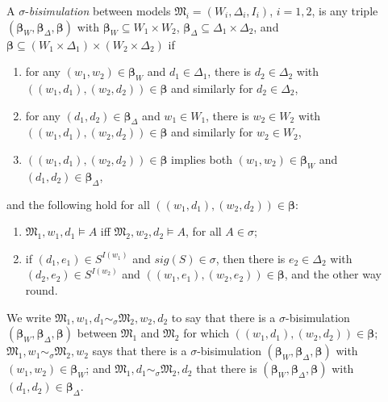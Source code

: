 \documentclass[10pt,a4paper]{amsart}
\theoremstyle{plain}
\theoremstyle{definition}
\newcommand{\nz}[1]{\textcolor{blue}{\bf!}%
	\marginpar[\parbox{15mm}{\raggedleft\scriptsize\textcolor{blue}{#1}}]%
	{\parbox{15mm}{\raggedright\scriptsize\textcolor{blue}{#1}}}}
\newcommand{\sig}{\mathit{sig}}
\newcommand{\bs}{\boldsymbol{\beta}}
\begin{document}
A $\sigma$-\emph{bisimulation} between models $\mathfrak{M}_{i}=(W_{i},\Delta_{i},I_{i})$, $i=1,2$,  is any triple 
$(\bs_{W},\bs_{\Delta},\bs)$ with $\bs_{W}\subseteq W_{1} \times W_{2}$, $\bs_{\Delta}\subseteq \Delta_{1} \times \Delta_{2}$, and $\bs \subseteq (W_{1}\times \Delta_{1}) \times (W_{2} \times \Delta_{2})$ if 
%
\begin{enumerate}[style=multiline,leftmargin=0.7cm]
	\item[\textbf{(w)}] for any $(w_{1},w_{2})\in \bs_{W}$ and $d_{1}\in \Delta_{1}$, there is $d_{2}\in \Delta_{2}$ with $((w_{1},d_{1}),(w_{2},d_{2}))\in \bs$ and similarly for $d_{2}\in \Delta_{2}$,
	
	\item[\textbf{(d)}] for any $(d_{1},d_{2})\in \bs_{\Delta}$ and $w_{1}\in W_{1}$, there is $w_{2}\in W_{2}$ with $((w_{1},d_{1}),(w_{2},d_{2}))\in \bs$ and similarly for \mbox{$w_{2}\in W_{2}$},
	
	\item[\textbf{(c)}] $((w_{1},d_{1}),(w_{2},d_{2})) \in \bs$ implies both	$(w_{1},w_{2}) \in \bs_{W}$ and $(d_{1},d_{2})\in \bs_{\Delta}$,
\end{enumerate}	
%
and the following hold for all $((w_{1},d_{1}),(w_{2},d_{2})) \in \bs$:
%
\begin{enumerate}[style=multiline,leftmargin=0.7cm]
	\item[\textbf{(a)}] $\mathfrak M_{1},w_{1},d_{1} \models A $ iff 
	$\mathfrak M_{2},w_{2},d_{2} \models A$, for all $A\in \sigma$;
	
	\item[\textbf{(r)}] if $(d_{1},e_{1})\in S^{I(w_1)}$ and $\sig(S)\in \sigma$, then there is $e_{2}\in \Delta_{2}$ with $(d_{2}, e_{2})\in S^{I(w_2)}$ and
	$((w_{1},e_{1}),(w_{2},e_{2}))\in \bs$, and the other way round.
   
\end{enumerate}
%
We write $\mathfrak{M}_{1},w_{1},d_{1}\sim_{\sigma} \mathfrak{M}_{2},w_{2},d_{2}$ to say that there is a $\sigma$-bisimulation $(\bs_{W},\bs_{\Delta},\bs)$ between $\mathfrak{M}_1$ and $\mathfrak{M}_{2}$ for which $((w_{1},d_{1}),(w_{2},d_{2}))\in \bs$; 
$\mathfrak{M}_{1},w_{1}\sim_{\sigma} \mathfrak{M}_{2},w_{2}$ says that there is a $\sigma$-bisimulation $(\bs_{W},\bs_{\Delta},\bs)$ with $(w_{1},w_{2})\in \bs_{W}$; and $\mathfrak{M}_{1},d_{1}\sim_{\sigma} \mathfrak{M}_{2},d_{2}$ that there is $(\bs_{W},\bs_{\Delta},\bs)$ with $(d_{1},d_{2})\in \bs_{\Delta}$. 
\end{document}
